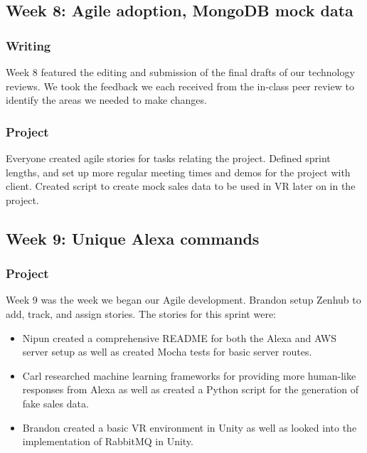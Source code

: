 \documentclass[onecolumn, draftclsnofoot,10pt, compsoc]{IEEEtran}
\begin{document}
    \subsection{Week 8: Agile adoption, MongoDB mock data }
    
        \subsubsection{Writing}
            Week 8 featured the editing and submission of the final drafts of our technology reviews. We took the feedback we each received from the in-class peer review to identify the areas we needed to make changes. 
            
        \subsubsection{Project}
            Everyone created agile stories for tasks relating the project. 
            Defined sprint lengths, and set up more regular meeting times and demos for the project with client.
            Created script to create mock sales data to be used in VR later on in the project.
            
    \subsection{Week 9: Unique Alexa commands}
    
        \subsubsection{Project}
            Week 9 was the week we began our Agile development. Brandon setup Zenhub to add, track, and assign stories. The stories for this sprint were:
            \begin{itemize}
                \item Nipun created a comprehensive README for both the Alexa and AWS server setup as well as created Mocha tests for basic server routes.
                \item Carl researched machine learning frameworks for providing more human-like responses from Alexa as well as created a Python script for the generation of fake sales data.
                \item Brandon created a basic VR environment in Unity as well as looked into the implementation of RabbitMQ in Unity. 
            \end{itemize}
            
\end{document}
